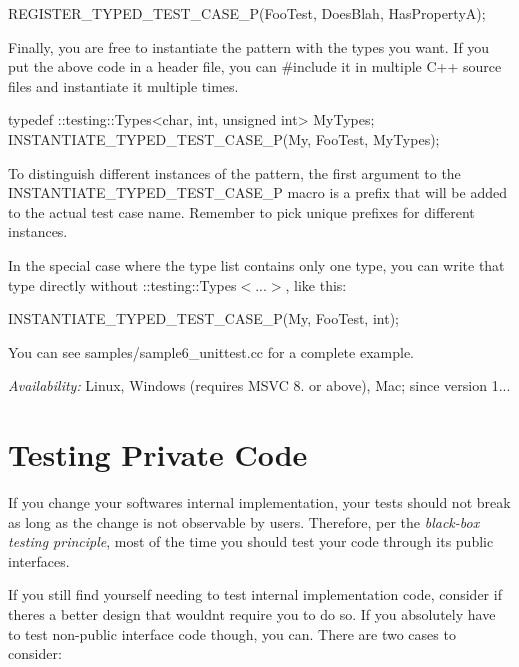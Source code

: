 \begin{DoxyCode}
REGISTER\_TYPED\_TEST\_CASE\_P(FooTest,
                           DoesBlah, HasPropertyA);
\end{DoxyCode}


Finally, you are free to instantiate the pattern with the types you want. If you put the above code in a header file, you can {\ttfamily \#include} it in multiple C++ source files and instantiate it multiple times.


\begin{DoxyCode}
typedef ::testing::Types<char, int, unsigned int> MyTypes;
INSTANTIATE\_TYPED\_TEST\_CASE\_P(My, FooTest, MyTypes);
\end{DoxyCode}


To distinguish different instances of the pattern, the first argument to the {\ttfamily I\+N\+S\+T\+A\+N\+T\+I\+A\+T\+E\+\_\+\+T\+Y\+P\+E\+D\+\_\+\+T\+E\+S\+T\+\_\+\+C\+A\+S\+E\+\_\+P} macro is a prefix that will be added to the actual test case name. Remember to pick unique prefixes for different instances.

In the special case where the type list contains only one type, you can write that type directly without {\ttfamily \+::testing\+::\+Types$<$...$>$}, like this\+:


\begin{DoxyCode}
INSTANTIATE\_TYPED\_TEST\_CASE\_P(My, FooTest, int);
\end{DoxyCode}


You can see {\ttfamily samples/sample6\+\_\+unittest.\+cc} for a complete example.

{\itshape Availability\+:} Linux, Windows (requires M\+S\+VC 8. or above), Mac; since version 1...

\section*{Testing Private Code}

If you change your software\textquotesingle{}s internal implementation, your tests should not break as long as the change is not observable by users. Therefore, per the {\itshape black-\/box testing principle}, most of the time you should test your code through its public interfaces.

If you still find yourself needing to test internal implementation code, consider if there\textquotesingle{}s a better design that wouldn\textquotesingle{}t require you to do so. If you absolutely have to test non-\/public interface code though, you can. There are two cases to consider\+:


